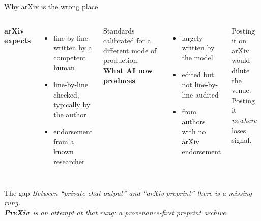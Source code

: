 \documentclass[10pt,aspectratio=43]{beamer}
\newcommand{\PreXiv}{\textbf{Pre}\textbf{\textit{\color{prexivrust}X}}\textbf{iv}}
\newenvironment{idea}[1][Idea]{\begin{block}{#1}\itshape}{\end{block}}
\begin{document}
\begin{frame}{Why arXiv is the wrong place}
  \begin{columns}[T,onlytextwidth]
      \textbf{arXiv expects}
      \begin{itemize}\small
        \item line-by-line written by a competent human
        \item line-by-line checked, typically by the author
        \item endorsement from a known researcher
      \end{itemize}
      \footnotesize Standards calibrated for a different mode of production.
      \textbf{What AI now produces}
      \begin{itemize}\small
        \item largely written by the model
        \item edited but not line-by-line audited
        \item from authors with no arXiv endorsement
      \end{itemize}
      \footnotesize Posting it on arXiv would dilute the venue. \\
      Posting it \emph{nowhere} loses signal.
  \end{columns}

  \medskip\pause
  \begin{idea}[The gap]
    Between ``private chat output'' and ``arXiv preprint'' there is a missing rung.\\
    \PreXiv\ is an attempt at that rung: \alert{a provenance-first preprint archive.}
  \end{idea}
\end{frame}
\end{document}
